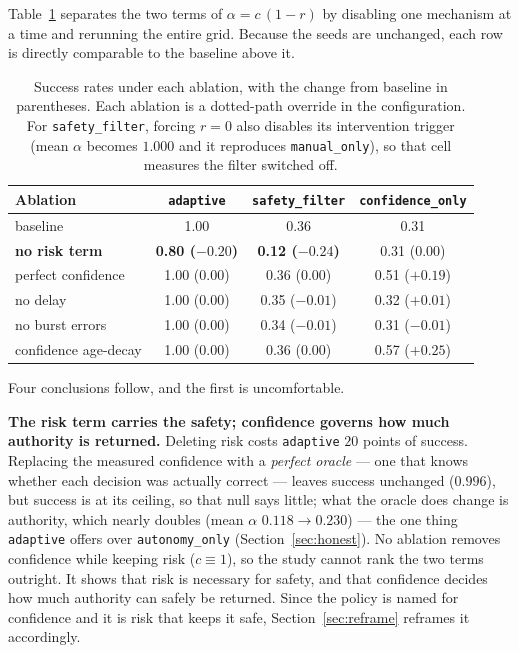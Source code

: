 \documentclass[11pt,a4paper]{article}
\newcommand{\vmanual}{\texttt{manual\_only}}
\newcommand{\vauto}{\texttt{autonomy\_only}}
\newcommand{\vconf}{\texttt{confidence\_only}}
\newcommand{\vadapt}{\texttt{adaptive}}
\newcommand{\vsafety}{\texttt{safety\_filter}}
\theoremstyle{plain}
\theoremstyle{definition}
\begin{document}
Table~\ref{tab:ablations} separates the two terms of
$\alpha = c\,(1-r)$ by disabling one mechanism at a time and rerunning
the entire grid. Because the seeds are unchanged, each row is directly
comparable to the baseline above it.

\begin{table}[htbp]
\centering
\small
\begin{tabular}{@{}lccc@{}}
\toprule
Ablation & \vadapt{} & \vsafety{} & \vconf{} \\
\midrule
baseline                  & 1.00 & 0.36 & 0.31 \\
\textbf{no risk term}     & \textbf{0.80 ($-0.20$)} & \textbf{0.12 ($-0.24$)} & 0.31 ($0.00$) \\
perfect confidence        & 1.00 ($0.00$)  & 0.36 ($0.00$)  & 0.51 ($+0.19$) \\
no delay                  & 1.00 ($0.00$)  & 0.35 ($-0.01$) & 0.32 ($+0.01$) \\
no burst errors           & 1.00 ($0.00$)  & 0.34 ($-0.01$) & 0.31 ($-0.01$) \\
confidence age-decay      & 1.00 ($0.00$)  & 0.36 ($0.00$)  & 0.57 ($+0.25$) \\
\bottomrule
\end{tabular}
\caption{Success rates under each ablation, with the change from
baseline in parentheses. Each ablation is a dotted-path override in the
configuration. For \vsafety{}, forcing $r = 0$ also disables its
intervention trigger (mean $\alpha$ becomes $1.000$ and it reproduces
\vmanual{}), so that cell measures the filter switched off.}
\label{tab:ablations}
\end{table}

Four conclusions follow, and the first is uncomfortable.

\textbf{The risk term carries the safety; confidence governs how much
authority is returned.} Deleting risk costs \vadapt{} $20$ points of
success. Replacing the measured confidence with a \emph{perfect oracle}
--- one that knows whether each decision was actually correct --- leaves
success unchanged ($0.996$), but success is at its ceiling, so that null
says little; what the oracle does change is authority, which nearly
doubles (mean $\alpha$ $0.118 \rightarrow 0.230$) --- the one thing
\vadapt{} offers over \vauto{} (Section~\ref{sec:honest}). No ablation
removes confidence while keeping risk ($c \equiv 1$), so the study
cannot rank the two terms outright. It shows that risk is necessary for
safety, and that confidence decides how much authority can safely be
returned. Since the policy is named for confidence and it is risk that
keeps it safe, Section~\ref{sec:reframe} reframes it accordingly.
\end{document}
